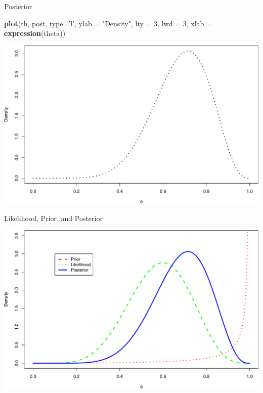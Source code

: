 \documentclass[
  ignorenonframetext,
]{beamer}
\newenvironment{Shaded}{\begin{snugshade}}{\end{snugshade}}
\newcommand{\DataTypeTok}[1]{\textcolor[rgb]{0.13,0.29,0.53}{#1}}
\newcommand{\DecValTok}[1]{\textcolor[rgb]{0.00,0.00,0.81}{#1}}
\newcommand{\KeywordTok}[1]{\textcolor[rgb]{0.13,0.29,0.53}{\textbf{#1}}}
\newcommand{\NormalTok}[1]{#1}
\newcommand{\StringTok}[1]{\textcolor[rgb]{0.31,0.60,0.02}{#1}}
\begin{document}
\begin{frame}[fragile]{Posterior}
\protect\hypertarget{posterior}{}

\begin{Shaded}
\begin{Highlighting}[]
\KeywordTok{plot}\NormalTok{(th, post, }\DataTypeTok{type=}\StringTok{'l'}\NormalTok{, }\DataTypeTok{ylab =} \StringTok{"Density"}\NormalTok{, }
     \DataTypeTok{lty =} \DecValTok{3}\NormalTok{, }\DataTypeTok{lwd =} \DecValTok{3}\NormalTok{, }\DataTypeTok{xlab =} \KeywordTok{expression}\NormalTok{(theta))}
\end{Highlighting}
\end{Shaded}

\includegraphics{01-intro-to-Bayes_files/figure-beamer/unnamed-chunk-4-1.pdf}

\end{frame}

\begin{frame}{Likelihood, Prior, and Posterior}
\protect\hypertarget{likelihood-prior-and-posterior}{}

\includegraphics{01-intro-to-Bayes_files/figure-beamer/unnamed-chunk-5-1.pdf}

\end{frame}
\end{document}
